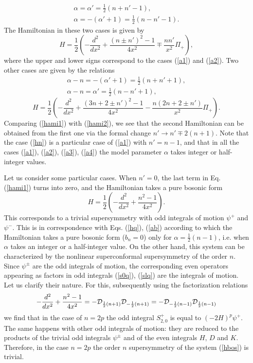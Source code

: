 \documentclass[a4paper,12pt]{article}
\begin{document}
\begin{eqnarray}
&\alpha=\alpha '=\frac{1}{2}(n+n '-1),&
\label{a1}\\
&\alpha=-(\alpha '+1)=\frac{1}{2}(n- n' -1).&
\label{a2}
\end{eqnarray}
The Hamiltonian in these two cases is given by
\begin{equation}
H=\frac{1}{2}\left(-\frac{d^2}{dx^2}+\frac{(n\pm n')^2-1}
{4x^2}\mp \frac{nn'}{x^2}\Pi_+\right),
\label{hami1}
\end{equation}
where the upper and lower signs correspond to the cases
(\ref{a1}) and (\ref{a2}).
Two other cases are given by
the relations
\begin{eqnarray}
&\alpha -n=-(\alpha '+1)=\frac{1}{2}(n+n '+1),&\label{a3}\\
&\alpha-n=\alpha '=\frac{1}{2}(n- n' +1),&
\label{a4}
\end{eqnarray}
\begin{equation}
H=\frac{1}{2}\left(-\frac{d^2}{dx^2}+\frac{(3n
+2\pm n')^2-1}
{4x^2}- \frac{n(2n+2\pm n')}{x^2}\Pi_+\right).
\label{hami2}
\end{equation}
Comparing (\ref{hami1}) with (\ref{hami2}),
we see that the second Hamiltonian can be obtained
from the first one via the formal change
$n'\rightarrow n'\mp 2(n+1)$.
Note that the case (\ref{hn})
is a particular case of (\ref{a1})
with $n'=n-1$, and that in all the cases
(\ref{a1}), (\ref{a2}), (\ref{a3}), (\ref{a4})
the model parameter
$\alpha$
takes integer or half-integer
values.

Let us consider some particular cases.
When $n'=0$, the last term in Eq. (\ref{hami1})
turns into zero, and the Hamiltonian takes a pure bosonic
form
\begin{equation}
H=\frac{1}{2}\left(-\frac{d^2}{dx^2}+\frac{n^2-1}{4x^2}
\right).
\label{hbos}
\end{equation}
This corresponds to a trivial supersymmetry
with odd integrals of motion $\psi^+$ and $\psi^-$.
This is in correspondence with Eqs. (\ref{hq}),
(\ref{ab}) according to which
the Hamiltonian
takes a pure bosonic form ($b_n=0$)
only for $\alpha=\frac{1}{2}(n-1)$,
i.e. when $\alpha$ takes an integer or a half-integer value.
On the other hand, this system can be characterized
by the nonlinear superconformal supersymmetry of
the order $n$.
Since $\psi^\pm$ are the odd integrals of motion,
the corresponding even operators
appearing as factors in odd integrals
(\ref{s0q}), (\ref{slq})
are the integrals of motion.
Let us clarify their nature.
For this,
subsequently using the factorization relations
\begin{equation}
-\frac{d^2}{dx^2}+\frac{n^2-1}{4x^2}=-
{\cal D}_{\frac{1}{2}(n+1)}
{\cal D}_{-\frac{1}{2}(n+1)}=
-{\cal D}_{-\frac{1}{2}(n-1)}
{\cal D}_{\frac{1}{2}(n-1)}
\label{factor}
\end{equation}
we find that in the case of $n=2p$
the odd integral $S^+_{2,0}$ is
equal to $(-2H)^p\psi^+$.
The same happens with
other odd integrals of motion:
they are reduced to the products of
the trivial
odd integrals $\psi^\pm$ and of the
even integrals $H$, $D$ and $K$.
Therefore, in the case $n=2p$ the order $n$ supersymmetry
of the system (\ref{hbos}) is trivial.
\end{document}
